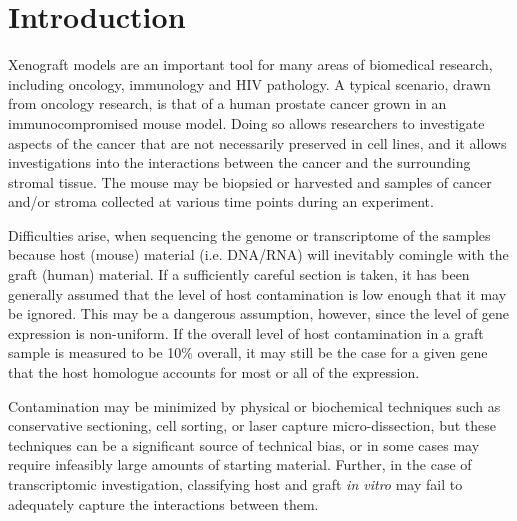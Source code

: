 \documentclass{bioinfo}
\begin{document}
\section{Introduction}

Xenograft models are an important tool for many areas of biomedical
research, including oncology, immunology and HIV pathology. A typical
scenario, drawn from oncology research, is that of a human prostate cancer
grown in an immunocompromised mouse model. Doing so allows researchers to investigate
aspects of the cancer that are not necessarily preserved in cell lines,
and it allows investigations into the interactions between the cancer and
the surrounding stromal tissue. The mouse may be biopsied or harvested
and samples of cancer and/or stroma collected at various time points during an experiment.

Difficulties arise, when sequencing the genome or transcriptome of the
samples because host (mouse) material (i.e. DNA/RNA) will inevitably
comingle with the graft (human) material.  If a sufficiently careful section
is taken, it has been generally assumed that the level
of host contamination is low enough that it may be ignored. This may be a
dangerous assumption, however, since the level of gene expression is
non-uniform. If the overall level of host contamination in a graft sample
is measured to be 10\% overall, it may still be the case for a given
gene that the host homologue accounts for most or all of the expression.

Contamination may be minimized by physical or biochemical techniques
such as conservative sectioning, cell sorting, or laser capture
micro-dissection, but these techniques can be a significant source of
technical bias, or in some cases may require infeasibly large amounts of
starting material. Further, in the case of transcriptomic investigation,
classifying host and graft \textit{in vitro} may fail to adequately
capture the interactions between them.
\end{document}
